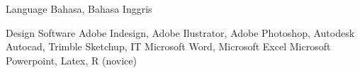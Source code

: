 
\begin{cvskills}
	\cvskill
	{Language}
	{Bahasa, Bahasa Inggris}

	\cvskill
	{Design Software}
	{
		Adobe Indesign,
		Adobe Ilustrator,
		Adobe Photoshop,
		Autodesk Autocad,
		Trimble Sketchup,
	}
	\cvskill
	{IT}
	{
		Microsoft Word,
		Microsoft Excel
		Microsoft Powerpoint,
		Latex,
		R (novice)
	}

\end{cvskills}


\begin{comment}

\begin{cventries}

	\cventry
	{Design} %
	{Architecture} %
	{} %
	{} %
	{
		\begin{cvitemsplus} %
			{
				\item {Adobe Indesign}
				\item {Adobe Illustrator}
				\item {Adobe Photoshop}
				\item{Autocad}
				\item{Sketchup}
			}
		\end{cvitemsplus}
	}

	\cventry
	{IELTS:5.5} %
	{Language} %
	{IDP Makassar} %
	{2019 August} %
	{
		\begin{cvitemsplus} %
			{
				\item {Listening: 6}
				\item {Reading: 5.5}
				\item {Writing: 5.5}
				\item {Speaking: 4.5}
			}
		\end{cvitemsplus}
	}


\end{cventries}

\end{comment}
